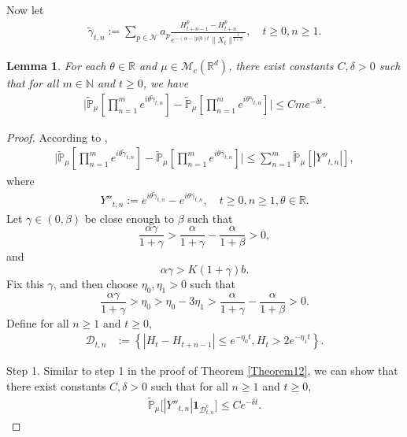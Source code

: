 \documentclass[12pt,a4paper]{amsart}
\theoremstyle{plain}
\newtheorem{lem}[thm]{Lemma}
\theoremstyle{definition}
\numberwithin{equation}{section}
\begin{document}
Now let
\begin{align}
    \tilde{\gamma}_{t,n}:=\sum_{p\in \mathcal{N}}a_p\frac{H^p_{t+n-1}-H^p_{t+n}}{e^{-(\alpha-|p|b)t}\|X_{t}\|^{\frac{1}{1+\beta}}},\quad t\geq 0, n\geq 1.
\end{align}
\begin{lem}\label{lem: lemma04}
     For each $\theta\in \mathbb{R}$ and $\mu\in \mathcal{M}_c(\mathbb{R}^d)$, there exist constants $C,\delta>0$
such that for all $m\in \mathbb{N}$ and $t\geq 0$, we have
\begin{align}
    \Big|\tilde{\mathbb{P}}_{\mu}[\prod_{n=1}^me^{i\theta \tilde{\gamma}_{t,n}}]-\tilde{\mathbb{P}}_{\mu}[\prod_{n=1}^me^{i\theta \bar{\gamma}_{t,n}}]\Big|\leq C m e^{-\delta t}.
\end{align}
\end{lem}
\begin{proof}
According to \cite[Lemma 3.4.3]{Durrett2010Probability},
\begin{align}\label{ineq: used next 3}
    \Big|\tilde{\mathbb{P}}_{\mu}[\prod_{n=1}^me^{i\theta \tilde{\gamma}_{t,n}}]-\tilde{\mathbb{P}}_{\mu}[\prod_{n=1}^me^{i\theta \bar{\gamma}_{t,n}}]\Big|\leq \sum_{n=1}^m\tilde{\mathbb{P}}_{\mu}[|Y''_{t,n}|],
\end{align}
where
\begin{align}
    Y''_{t,n}:=e^{i\theta\tilde{\gamma}_{t,n}}-e^{i\theta\bar{\gamma}_{t,n}},\quad t\geq 0, n\geq 1, \theta\in \mathbb{R}.
\end{align}
    Let $\gamma \in (0,\beta)$ be close enough to $\beta$ such that
\[
    \frac{\alpha \gamma}{1+\gamma} > \frac{\alpha}{1+\gamma} - \frac{\alpha}{1+\beta} > 0,
\]
and
\[
   \alpha\gamma>K(1+\gamma)b.
  \]
  Fix this $\gamma$, and then choose $\eta_0,\eta_1>0$ such that
\[
    \frac{\alpha \gamma}{1+\gamma} >\eta_0 > \eta_0 - 3\eta_1 > \frac{\alpha}{1+\gamma} - \frac{\alpha}{1+\beta} > 0.
\]
    Define for all $n \geq 1$ and $t\geq 0$,
\begin{align}
\label{def: Dtk1}
    \mathcal{D}_{t,n}&:=\left\{|H_t-H_{t+n-1}|\leq  e^{-\eta_0 t}, H_{t}> 2e^{-\eta_1t}\right\}.
\end{align}

Step 1. Similar to step 1 in the proof of Theorem \ref{Theorem12},
we can show that there exist constants $C,\delta >0$ such that for all $n \geq 1$ and $t\geq 0$,
\begin{align}
\label{thm12111}
    \mathbb{\tilde{P}}_{\mu}\big[|Y''_{t,n}|\mathbf{1}_{\mathcal{D}^c_{t,n}}\big]
    \leq C e^{-\delta t}.
\end{align}
\begin{comment}


\end{comment}
\end{proof}
\end{document}
